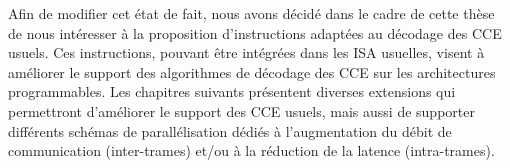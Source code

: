 \documentclass[../main.tex]{subfiles}
\begin{document}
Afin de modifier cet état de fait, nous avons décidé dans le cadre de cette thèse de nous intéresser à la proposition d'instructions adaptées au décodage des CCE usuels. Ces instructions, pouvant être intégrées dans les ISA usuelles, visent à améliorer le support des algorithmes de décodage des CCE sur les architectures programmables. Les chapitres suivants présentent diverses extensions qui permettront d'améliorer le support des CCE usuels, mais aussi de supporter différents schémas de parallélisation dédiés à l'augmentation du débit de communication (inter-trames) et/ou à la réduction de la latence (intra-trames).
\end{document}

